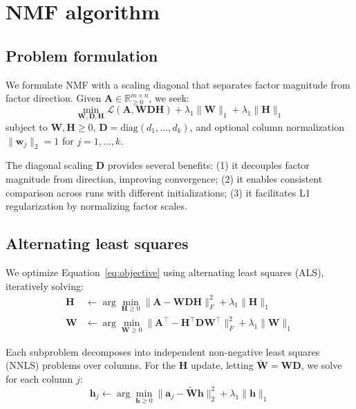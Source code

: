 \documentclass[11pt]{article}
\begin{document}
\section{NMF algorithm} \label{sec:algorithm}

\subsection{Problem formulation}

We formulate NMF with a scaling diagonal that separates factor magnitude from 
factor direction. Given $\mathbf{A} \in \mathbb{R}_{\geq 0}^{m \times n}$, we 
seek:
\begin{equation}
  \min_{\mathbf{W}, \mathbf{D}, \mathbf{H}} 
  \mathcal{L}(\mathbf{A}, \mathbf{W}\mathbf{D}\mathbf{H}) + 
  \lambda_1 \|\mathbf{W}\|_1 + \lambda_1 \|\mathbf{H}\|_1
  \label{eq:objective}
\end{equation}
subject to $\mathbf{W}, \mathbf{H} \geq 0$, $\mathbf{D} = \text{diag}(d_1, 
\ldots, d_k)$, and optional column normalization $\|\mathbf{w}_j\|_2 = 1$ for 
$j = 1, \ldots, k$.

The diagonal scaling $\mathbf{D}$ provides several benefits: (1) it decouples 
factor magnitude from direction, improving convergence; (2) it enables 
consistent comparison across runs with different initializations; (3) it 
facilitates L1 regularization by normalizing factor scales.

\subsection{Alternating least squares}

We optimize Equation~\ref{eq:objective} using alternating least squares (ALS), 
iteratively solving:
\begin{align}
  \mathbf{H} &\leftarrow \arg\min_{\mathbf{H} \geq 0} 
  \|\mathbf{A} - \mathbf{W}\mathbf{D}\mathbf{H}\|_F^2 + \lambda_1\|\mathbf{H}\|_1 
  \label{eq:h_update} \\
  \mathbf{W} &\leftarrow \arg\min_{\mathbf{W} \geq 0} 
  \|\mathbf{A}^\top - \mathbf{H}^\top\mathbf{D}\mathbf{W}^\top\|_F^2 + 
  \lambda_1\|\mathbf{W}\|_1
  \label{eq:w_update}
\end{align}

Each subproblem decomposes into independent non-negative least squares (NNLS) 
problems over columns. For the $\mathbf{H}$ update, letting 
$\tilde{\mathbf{W}} = \mathbf{W}\mathbf{D}$, we solve for each column $j$:
\begin{equation}
  \mathbf{h}_j \leftarrow \arg\min_{\mathbf{h} \geq 0} 
  \|\mathbf{a}_j - \tilde{\mathbf{W}}\mathbf{h}\|_2^2 + \lambda_1\|\mathbf{h}\|_1
  \label{eq:nnls}
\end{equation}
\end{document}
